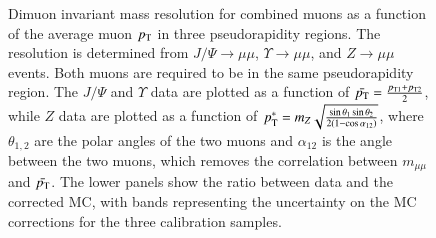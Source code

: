 \begin{figure}[htbp]
{		
	}
	\caption{Dimuon invariant mass resolution for combined muons as a function of the average muon $p_{\text{T}}$ in three pseudorapidity regions. The resolution is determined from $J/\Psi\rightarrow\mu\mu$, $\Upsilon\rightarrow\mu\mu$, and $Z\rightarrow\mu\mu$ events. Both muons are required to be in the same pseudorapidity region. The $J/\Psi$ and $\Upsilon$ data are plotted as a function of $\bar{p_{\text{T}}}=\frac{p_{\mathrm{T}1}+p_{\mathrm{T}2}}{2}$, while $Z$ data are plotted as a function of $p_{\text{T}}^*=m_{Z}\sqrt{\frac{\sin\theta_1\sin\theta_2}{2(1-\cos\alpha_{12})}}$, where $\theta_{1,2}$ are the polar angles of the two muons and $\alpha_{12}$ is the angle between the two muons, which removes the correlation between $m_{\mu\mu}$ and $\bar{p_{\text{T}}}$.  The lower panels show the ratio between data and the corrected MC, with bands representing the uncertainty on the MC corrections for the three calibration samples.}
	\label{fig:reco-muon-resolution}
\end{figure}



